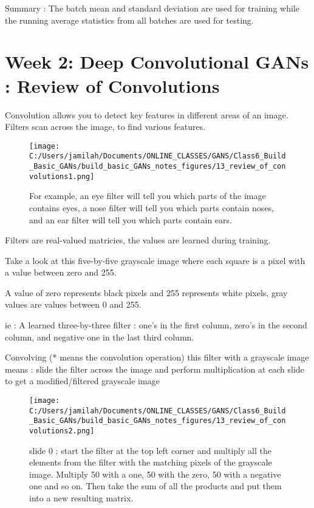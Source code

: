 \documentclass[11pt, onecolumn]{article}
\begin{document}
Summary : 
The batch mean and standard deviation are used for training while the running average statistics from all batches are used for testing. 


\section{Week 2: Deep Convolutional GANs : Review of Convolutions}

Convolution allows you to detect key features in different areas of an image.   Filters scan across
the image, to find various features.

\begin{figure}[htp]
\begin{center}
\texttt{[image: C:/Users/jamilah/Documents/ONLINE\_CLASSES/GANS/Class6\_Build\_Basic\_GANs/build\_basic\_GANs\_notes\_figures/13\_review\_of\_convolutions1.png]}
\end{center}
\caption{For example, an eye filter will tell you which parts of the image contains eyes, a nose filter will tell you which parts contain noses, and an ear filter will tell you which parts contain ears.}
\label{13_review_of_convolutions1}
\end{figure}

Filters are real-valued matricies, the values are learned during training. 

Take a look at this five-by-five grayscale image where each square is a pixel with a value between zero and 255.

A value of zero represents black pixels and 255 represents white pixels, gray values are values between 0 and 255.

ie :
A learned three-by-three filter : one's in the first column, zero's in the second column, and negative one in the last third column.

Convolving (* means the convolution operation) this filter with a grayscale image means : slide the filter across the image and perform multiplication at each slide to get a modified/filtered grayscale image

\begin{figure}[htp]
\begin{center}
\texttt{[image: C:/Users/jamilah/Documents/ONLINE\_CLASSES/GANS/Class6\_Build\_Basic\_GANs/build\_basic\_GANs\_notes\_figures/13\_review\_of\_convolutions2.png]}
\end{center}
\caption{slide 0 : start the filter at the top left corner and multiply all the elements from the filter with the matching pixels of the grayscale image.  Multiply 50 with a one, 50 with the zero, 50 with a negative one and so on.  Then take the sum of all the products and put them into a new resulting matrix.}
\label{13_review_of_convolutions2}
\end{figure}
\end{document}
